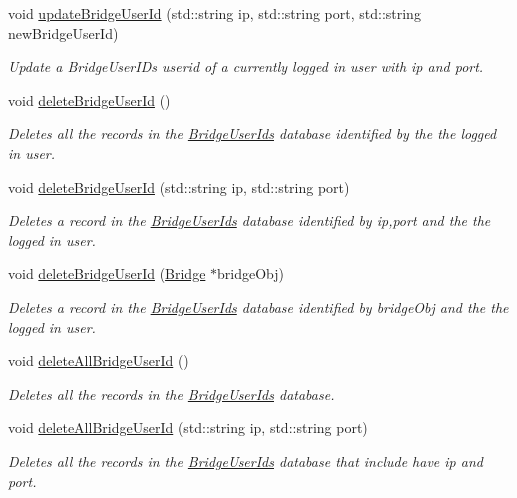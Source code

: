 \begin{DoxyCompactItemize}
void \hyperlink{classSession_a66b9558368c410a57959d34b95d92d85}{update\+Bridge\+User\+Id} (std\+::string ip, std\+::string port, std\+::string new\+Bridge\+User\+Id)
\begin{DoxyCompactList}\small\item\em Update a Bridge\+User\+ID\textquotesingle{}s userid of a currently logged in user with ip and port. \end{DoxyCompactList}\item 
void \hyperlink{classSession_a0ce543e30e589f57f424b223e78d7727}{delete\+Bridge\+User\+Id} ()
\begin{DoxyCompactList}\small\item\em Deletes all the records in the \hyperlink{classBridgeUserIds}{Bridge\+User\+Ids} database identified by the the logged in user. \end{DoxyCompactList}\item 
void \hyperlink{classSession_ae72de69f3e1a148bc633b348e984bf63}{delete\+Bridge\+User\+Id} (std\+::string ip, std\+::string port)
\begin{DoxyCompactList}\small\item\em Deletes a record in the \hyperlink{classBridgeUserIds}{Bridge\+User\+Ids} database identified by ip,port and the the logged in user. \end{DoxyCompactList}\item 
void \hyperlink{classSession_add42d80da3d9dd34278e753ef623a7c8}{delete\+Bridge\+User\+Id} (\hyperlink{classBridge}{Bridge} $\ast$bridge\+Obj)
\begin{DoxyCompactList}\small\item\em Deletes a record in the \hyperlink{classBridgeUserIds}{Bridge\+User\+Ids} database identified by bridge\+Obj and the the logged in user. \end{DoxyCompactList}\item 
void \hyperlink{classSession_ab7c1c96f6cc41a6f9bbf8915ddd3a171}{delete\+All\+Bridge\+User\+Id} ()
\begin{DoxyCompactList}\small\item\em Deletes all the records in the \hyperlink{classBridgeUserIds}{Bridge\+User\+Ids} database. \end{DoxyCompactList}\item 
void \hyperlink{classSession_a6331ee5838df2948eb6d92423ba7f976}{delete\+All\+Bridge\+User\+Id} (std\+::string ip, std\+::string port)
\begin{DoxyCompactList}\small\item\em Deletes all the records in the \hyperlink{classBridgeUserIds}{Bridge\+User\+Ids} database that include have ip and port. \end{DoxyCompactList}\item 

\end{DoxyCompactItemize}
